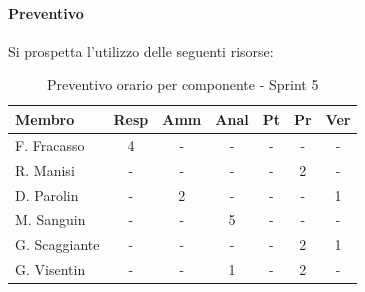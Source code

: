 \documentclass[a4paper,12pt]{article}
\begin{document}
\paragraph{Preventivo}
Si prospetta l'utilizzo delle seguenti risorse:

\begin{table}[H]
    \centering
    \renewcommand{\arraystretch}{1.3}
    \small 
    \begin{tabularx}{\textwidth}{|l|C|C|C|C|C|C|}
        \hline
        \textbf{Membro} & \textbf{Resp} & \textbf{Amm} & \textbf{Anal} & \textbf{Pt} & \textbf{Pr} & \textbf{Ver} \\
        \hline
        F. Fracasso & 4 & - & - & - & - & - \\
        \hline
        R. Manisi & - & - & - & - & 2 & - \\
        \hline
        D. Parolin & - & 2 & - & - & - & 1 \\
        \hline
        M. Sanguin & - & - & 5 & - & - & - \\
        \hline
        G. Scaggiante & - & - & - & - & 2 & 1 \\
        \hline
        G. Visentin & - & - & 1 & - & 2 & - \\
        \hline
    \end{tabularx}
    \caption{Preventivo orario per componente - Sprint 5}
    \label{tab:preventivo_sprint5}
\end{table}
\end{document}
